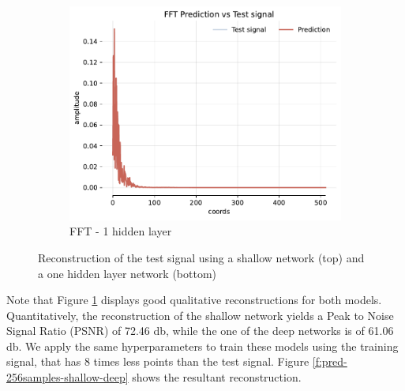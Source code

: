 \begin{figure}[!h]
    \begin{subfigure}[b]{0.32\textwidth}
        \centering
        \includegraphics[width=\textwidth]{img/ch3/fft-64hf-1hl-32w-filter3.pdf}
        \caption{FFT - 1 hidden layer}
    \end{subfigure}
    \caption{Reconstruction of the test signal using a shallow network (top) and a one hidden layer network (bottom)}
    \label{f:pred-2048samples-shallow-deep}
\end{figure}

Note that Figure \ref{f:pred-2048samples-shallow-deep} displays good qualitative reconstructions for both models. Quantitatively, the reconstruction of the shallow network yields a Peak to Noise Signal Ratio (PSNR) of 72.46 db, while the one of the deep networks is of 61.06 db. We apply the same hyperparameters to train these models using the training signal, that has 8 times less points than the test signal. Figure \ref{f:pred-256samples-shallow-deep} shows the resultant reconstruction.


